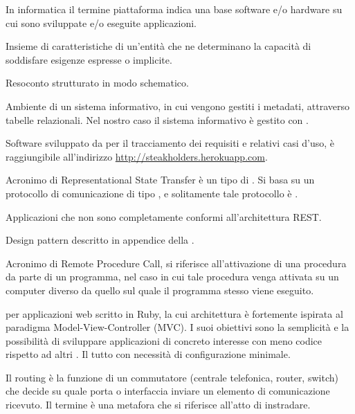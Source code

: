 In informatica il termine piattaforma indica una base software e/o hardware su cui sono sviluppate e/o eseguite applicazioni.


Insieme di caratteristiche di un'entità che ne determinano la capacità di soddisfare esigenze espresse o implicite.


Resoconto strutturato in modo schematico.

Ambiente di un sistema informativo, in cui vengono gestiti i metadati, attraverso tabelle relazionali.
Nel nostro caso il sistema informativo è gestito con .

Software sviluppato da \GroupName{} per il tracciamento dei requisiti e relativi casi d'uso, è raggiungibile all'indirizzo \url{http://steakholders.herokuapp.com}.

Acronimo di Representational State Transfer è un tipo di . Si basa su un protocollo di comunicazione  di tipo , e solitamente tale protocollo è .

Applicazioni che non sono completamente conformi all'architettura REST.

Design pattern descritto in appendice della \SpecificaTecnica{}.

Acronimo di Remote Procedure Call, si riferisce all'attivazione di una procedura da parte di un programma, nel caso in cui tale procedura venga attivata su un computer diverso da quello sul quale il programma stesso viene eseguito.

  per applicazioni web scritto in Ruby, la cui architettura è fortemente ispirata al paradigma Model-View-Controller (MVC). I suoi obiettivi sono la semplicità e la possibilità di sviluppare applicazioni di concreto interesse con meno codice rispetto ad altri . Il tutto con necessità di configurazione minimale.

Il routing è la funzione di un commutatore (centrale telefonica, router, switch) che decide su quale porta o interfaccia inviare un elemento di comunicazione ricevuto. Il termine è una metafora che si riferisce all'atto di instradare.

